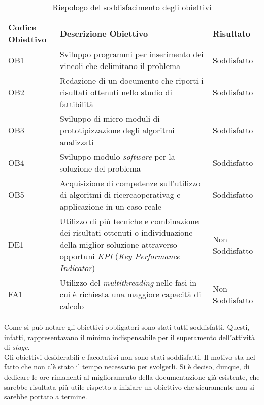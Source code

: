 \begin{center}
    \begin{longtable}{m{3cm}m{9cm}m{2cm}}
    \caption{Riepologo del soddisfacimento degli obiettivi}
    \label{tab:raggiungimento-obiettivi}
    \\ \hline
    \centering \textbf{Codice Obiettivo} & \centering \textbf{Descrizione Obiettivo} & \centering \textbf{Risultato} \arraybackslash \\
    \hline
    \centering OB1 & Sviluppo programmi per inserimento
    dei vincoli che delimitano il problema & \centering Soddisfatto \arraybackslash \\
    \hline
    \centering OB2 & Redazione di un documento che riporti
    i risultati ottenuti nello studio di fattibilità & \centering Soddisfatto \arraybackslash \\
    \hline
    \centering OB3 & Sviluppo di micro-moduli di prototipizzazione degli algoritmi analizzati & \centering Soddisfatto \arraybackslash \\
    \hline
    \centering OB4 & Sviluppo modulo \textit{software} per
    la soluzione del problema & \centering Soddisfatto \arraybackslash \\
    \hline
    \centering OB5 & Acquisizione di competenze sull’utilizzo
    di algoritmi di \gls{ricercaoperativag} e
    applicazione in un caso reale & \centering Soddisfatto \arraybackslash \\
    \hline
    \centering DE1 & Utilizzo di più tecniche e combinazione dei risultati
    ottenuti o individuazione della miglior soluzione attraverso
    opportuni \textit{KPI} (\textit{Key Performance Indicator}) & \centering Non Soddisfatto \arraybackslash \\
    \hline
    \centering FA1 & Utilizzo del \textit{multithreading}
    nelle fasi in cui è richiesta una
    maggiore capacità di calcolo & \centering Non Soddisfatto \arraybackslash \\
    \hline
    \end{longtable}
\end{center}%

\noindent Come si può notare gli obiettivi obbligatori
sono stati tutti soddisfatti. Questi, infatti, rappresentavano
il minimo indispensabile per il superamento dell'attività di \textit{stage}.\\
Gli obiettivi desiderabili e facoltativi non sono stati soddisfatti.
Il motivo sta nel fatto che non c'è stato il tempo necessario per svolgerli.
Si è deciso, dunque, di dedicare le ore rimanenti
al miglioramento della documentazione già esistente, che sarebbe risultata
più utile rispetto a iniziare un obiettivo che sicuramente non si sarebbe portato a termine.

